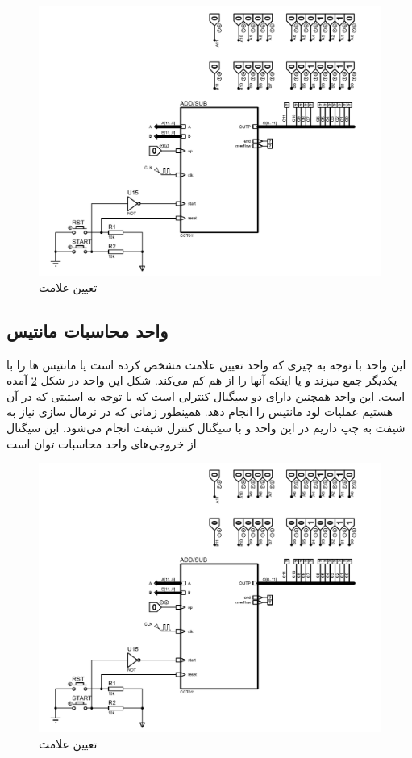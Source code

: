 \documentclass{article}
\begin{document}
\begin{figure}
	\centering
	\includegraphics[scale=0.5, page=7]{./graphics/graphics}
	\caption{تعیین علامت}
	\label{operator-sign}
\end{figure}

\subsection{واحد محاسبات مانتیس}
این واحد با توجه به چیزی که واحد تعیین علامت مشخص کرده است یا مانتیس ها را با یکدیگر جمع میزند و یا اینکه آنها را از هم کم می‌کند. شکل این واحد در شکل \ref{mantis-op} آمده است.
این واحد همچنین دارای دو سیگنال کنترلی است که با توجه به استیتی که در آن هستیم عملیات لود مانتیس را انجام دهد. همینطور زمانی که در نرمال سازی نیاز به شیفت به چپ داریم در این واحد و با سیگنال کنترل شیفت انجام می‌شود. این سیگنال از خروجی‌های واحد محاسبات توان است. 
\begin{figure}
	\centering
	\includegraphics[scale=0.4, page=8]{./graphics/graphics}
	\caption{تعیین علامت}
	\label{mantis-op}
\end{figure}
\end{document}
